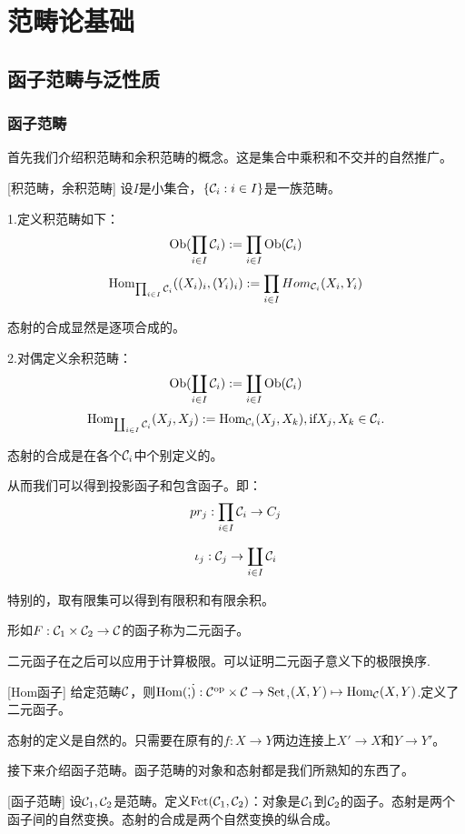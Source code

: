 \ifx\allfiles\undefined

	
	
\else
\fi

\chapter{范畴论基础}
\section{函子范畴与泛性质}
\subsection{函子范畴}
首先我们介绍积范畴和余积范畴的概念。这是集合中乘积和不交并的自然推广。
\begin{definition}{}[积范畴，余积范畴]
    设$I$是小集合，$\{\mathcal{C}_i:i \in I\}$是一族范畴。

    1.定义积范畴如下：
    $$
    \text{Ob}(\prod_{i \in I}\mathcal{C}_i):=\prod_{i \in I}\text{Ob}(\mathcal{C}_i)
    $$
    $$
    \text{Hom}_{\prod_{i \in I}\mathcal{C}_i}((X_i)_i,(Y_i)_i):=\prod_{i \in I}Hom_{\mathcal{C}_i}(X_i,Y_i)
    $$

    态射的合成显然是逐项合成的。

    2.对偶定义余积范畴：
    $$
    \text{Ob}(\coprod_{i \in I}\mathcal{C}_i):=\coprod_{i \in I}\text{Ob}(\mathcal{C}_i)
    $$
    $$
    \text{Hom}_{\coprod_{i \in I}\mathcal{C}_i}(X_j,X_j):=\text{Hom}_{\mathcal{C}_i}(X_j,X_k), \text{if} X_j,X_k \in \mathcal{C}_i.
    $$

    态射的合成是在各个$\mathcal{C}_i$中个别定义的。

    从而我们可以得到投影函子和包含函子。即：
    $$
    pr_j:\prod_{i \in I}\mathcal{C}_i \to C_j
    $$

    $$
    \iota_j: \mathcal{C}_j \to \coprod_{i \in I}\mathcal{C}_i 
    $$
    
    特别的，取有限集可以得到有限积和有限余积。
\end{definition}
\begin{definition}{}
    形如$F:\mathcal{C}_1 \times \mathcal{C}_2 \to \mathcal{C}$的函子称为二元函子。
\end{definition}
    二元函子在之后可以应用于计算极限。可以证明二元函子意义下的极限换序.
\begin{example}{}[Hom函子]
    给定范畴$\mathcal{C}$，则$\text{Hom}(\dot,\dot):\mathcal{C}^{\text{op}} \times \mathcal{C} \to \text{Set}$,$(X,Y) \mapsto \text{Hom}_{\mathcal{C}}(X,Y)$.定义了二元函子。

    态射的定义是自然的。只需要在原有的$f:X\to Y$两边连接上$X' \to  X$和$Y \to Y'$。
\end{example}
接下来介绍函子范畴。函子范畴的对象和态射都是我们所熟知的东西了。
\begin{definition}{}[函子范畴]
    设$\mathcal{C}_1,\mathcal{C}_2$是范畴。定义$\text{Fct}(\mathcal{C}_1,\mathcal{C}_2)$：对象是$\mathcal{C}_1$到$\mathcal{C}_2$的函子。态射是两个函子间的自然变换。态射的合成是两个自然变换的纵合成。
\end{definition}


